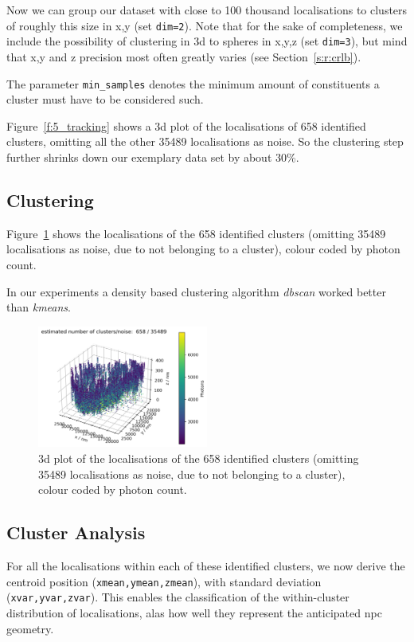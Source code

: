 \documentclass[11pt, a4paper, oneside, twocolumn]{report}
\renewcommand{\tt}{\texttt}
\newcommand{\e}{\emph}
\begin{document}
Now we can group our dataset with close to 100 thousand localisations
to clusters of roughly this size in x,y (set \tt{dim=2}). Note that
for the sake of completeness, we include the possibility of clustering
in 3d to spheres in x,y,z (set \tt{dim=3}), but mind that x,y and z
precision most often greatly varies (see Section~\ref{s:r:crlb}).

The parameter \tt{min\_samples} denotes the minimum amount of
constituents a cluster must have to be considered such.

Figure~\ref{f:5_tracking} shows a 3d plot of the localisations of 658
identified clusters, omitting all the other 35489 localisations as
noise. So the clustering step further shrinks down our exemplary data
set by about 30\%.


\subsection{Clustering}

Figure~\ref{f:6_clustering} shows the localisations of the 658
identified clusters (omitting 35489 localisations as noise, due to not
belonging to a cluster), colour coded by photon count.

In our experiments a density based clustering algorithm \e{dbscan}
\cite{eks96} worked better than \e{kmeans}.

\begin{figure}[h!]
  \centering
  \includegraphics[width=0.5\textwidth]{6_clustering.png}
  \caption{3d plot of the localisations of the 658 identified clusters
    (omitting 35489 localisations as noise, due to not belonging to a
    cluster), colour coded by photon count.}
  \label{f:6_clustering}
\end{figure}


\subsection{Cluster Analysis}

For all the localisations within each of these identified clusters, we
now derive the centroid position (\tt{xmean,ymean,zmean}), with
standard deviation (\tt{xvar,yvar,zvar}). This enables the
classification of the within-cluster distribution of localisations,
alas how well they represent the anticipated \gls{npc} geometry.
\end{document}
